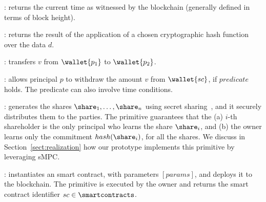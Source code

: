 \begin{asparaitem}
	\item \primtime: 
	returns the current time as witnessed by the blockchain (generally defined in terms of block height).
		
	\item {}: 
	returns the result of the application of a chosen cryptographic hash function over the data $d$.
	
	\item {}: 
	transfers $v$ from $\wallet{p_1}$ to $\wallet{p_2}$.
	
	\item {}:
	allows principal $p$ to withdraw the amount $v$ from $\wallet{sc}$, if $predicate$ holds. The predicate can also involve time conditions.
	
	\item \primgenerateshares{\secret}{[users]}: 
	generates the shares $\share_1, \ldots, \share_n$ using \KofN secret sharing~\cite{Shamir:1979:SS:359168.359176}, and it securely distributes them to the parties.
	The primitive guarantees that the (a) $i$-th shareholder is the only principal who learns the share $\share_i$, and (b) the owner learns only the commitment $hash(\share_i)$, for all the shares. 
	We discuss in Section~\ref{sect:realization} how our prototype implements this primitive by leveraging sMPC.	
	
	\item \priminit{[params]}: 
	instantiates an \shortname smart contract, with parameters $[params]$, and deploys it to the blockchain.
	The primitive is executed by the owner and returns the smart contract identifier $sc \in \smartcontracts$.

\end{asparaitem}


